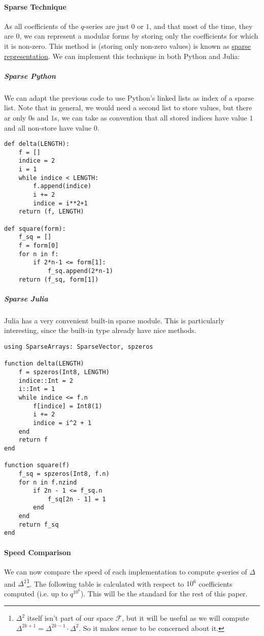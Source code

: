 \paragraph{Sparse Technique}
As all coefficients of the $q$-series are just $0$ or $1$, and that most of the time, they are $0$, we can represent a modular forms by storing only the coefficients for which it is non-zero.
This method is (storing only non-zero values) is known as \href{https://en.wikipedia.org/wiki/Sparse_matrix}{sparse representation}.
We can implement this technique in both Python and Julia:
\subparagraph{Sparse Python}
We can adapt the previous code to use Python's linked lists as index of a sparse list.
Note that in general, we would need a second list to store values, but there ar only $0$s and $1$s, we can take as convention that all stored indices have value $1$ and all non-store have value $0$. 
\begin{verbatim}
def delta(LENGTH):
	f = []
	indice = 2
	i = 1
	while indice < LENGTH:
		f.append(indice)
		i += 2
		indice = i**2+1
	return (f, LENGTH)

def square(form):
	f_sq = []
	f = form[0]
	for n in f:
		if 2*n-1 <= form[1]:
			f_sq.append(2*n-1)
	return (f_sq, form[1])
\end{verbatim}
\subparagraph{Sparse Julia}
Julia has a very convenient built-in sparse module.
This is particularly interesting, since the built-in type already have nice methods.
\begin{verbatim}
using SparseArrays: SparseVector, spzeros

function delta(LENGTH)
	f = spzeros(Int8, LENGTH)
	indice::Int = 2
	i::Int = 1
	while indice <= f.n
		f[indice] = Int8(1)
		i += 2
		indice = i^2 + 1
	end
	return f
end

function square(f)
	f_sq = spzeros(Int8, f.n)
	for n in f.nzind
		if 2n - 1 <= f_sq.n
			f_sq[2n - 1] = 1
		end
	end
	return f_sq
end
\end{verbatim}
\paragraph{Speed Comparison}
We can now compare the speed of each implementation to compute $q$-series of $\Delta$ and $\Delta^2$\footnote{$\Delta^2$ itself isn't part of our space $\mathcal{F}$, but it will be useful as we will compute $\Delta^{2k+1} = \Delta^{2k-1}\cdot \Delta^2$. So it makes sense to be concerned about it.}.
The following table is calculated with respect to $10^6$ coefficients computed (i.e. up to $q^{10^6}$).
This will be the standard for the rest of this paper.

